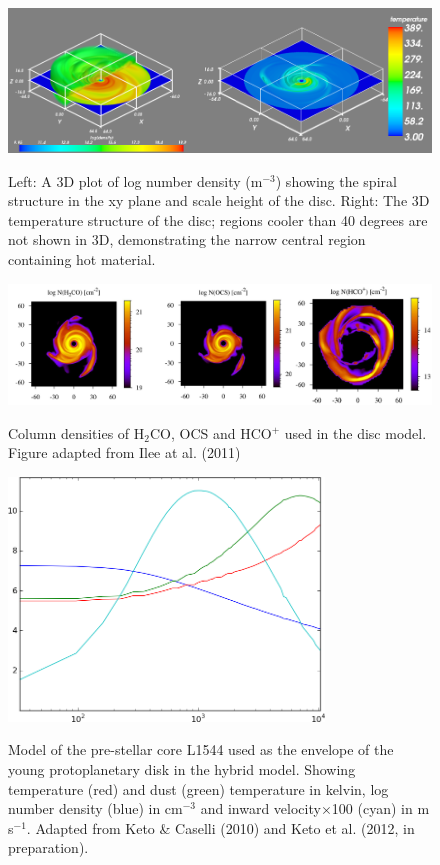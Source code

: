 \documentclass[useAMS,usenatbib]{mn2e}
\begin{document}
\begin{figure}
 \includegraphics[width=168mm]{Figures/model/rhoT2.png}
 \label{rhoT} 
 \caption{Left: A 3D plot of log number density (m$^{-3}$) showing the spiral structure in the xy plane and scale height of the disc. Right: The 3D temperature structure of the disc; regions cooler than 40 degrees are not shown in 3D, demonstrating the narrow central region containing hot material.}
\end{figure}

\begin{figure}
 \includegraphics[width=168mm]{Figures/model/columnDensities2.png}
 \label{Chemistry} 
 \caption{Column densities of H$_2$CO, OCS and HCO$^+$ used in the disc model. Figure adapted from Ilee at al. (2011)}
\end{figure}

\begin{figure}
 \includegraphics[width=84mm]{Figures/model/L1544model_used.png}
 \label{fig:l1544_model}
 \caption{Model of the pre-stellar core L1544 used as the envelope of the young protoplanetary disk in the hybrid model. Showing temperature (red) and dust (green) temperature in kelvin, log number density (blue) in cm$^{-3}$ and inward velocity$\times$100 (cyan) in m$\,$s$^{-1}$. Adapted from Keto \& Caselli (2010) and Keto et al. (2012, in preparation).}
\end{figure}
\end{document}

